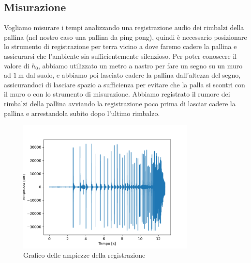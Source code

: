 \documentclass[a4paper]{article}
\begin{document}
    \subsection{Misurazione}
    Vogliamo misurare i tempi analizzando una registrazione audio dei rimbalzi della pallina
    (nel nostro caso una pallina da ping pong),
    quindi è necessario posizionare lo strumento di registrazione per terra vicino
    a dove faremo cadere la pallina e assicurarsi che l'ambiente sia sufficientemente silenzioso.
    Per poter conoscere il valore di $h_0$, abbiamo utilizzato un metro a nastro per
    fare un segno su un muro ad $\SI{1}{\meter}$ dal suolo, e abbiamo poi lasciato cadere
    la pallina dall'altezza del segno, assicurandoci di lasciare spazio a sufficienza per evitare
    che la palla si scontri con il muro o con lo strumento di misurazione.
    Abbiamo registrato il rumore dei rimbalzi della pallina avviando
    la registrazione poco prima di lasciar cadere la pallina e arrestandola subito dopo l'ultimo rimbalzo.
    \begin{figure}[ht!]
        \centering
        \includegraphics[width=0.8\textwidth]{extra/audio_rimbalzi.pdf}
        \caption{Grafico delle ampiezze della registrazione}
        \label{fig:ampiezze}
    \end{figure}
\end{document}
